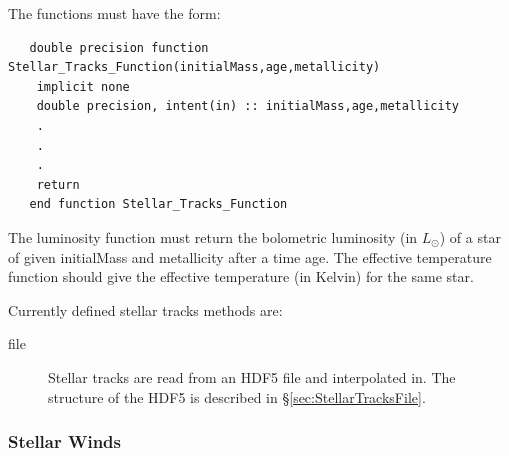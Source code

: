The functions must have the form:
\begin{verbatim}
   double precision function Stellar_Tracks_Function(initialMass,age,metallicity)
    implicit none
    double precision, intent(in) :: initialMass,age,metallicity
    .
    .
    .
    return
   end function Stellar_Tracks_Function 
\end{verbatim}
The luminosity function must return the bolometric luminosity (in $L_\odot$) of a star of given {\normalfont \ttfamily initialMass} and {\normalfont \ttfamily metallicity} after a time {\normalfont \ttfamily age}. The effective temperature function should give the effective temperature (in Kelvin) for the same star.

Currently defined stellar tracks methods are:
\begin{description}
 \item [{\normalfont \ttfamily file}] Stellar tracks are read from an HDF5 file and interpolated in. The structure of the HDF5 is described in \S\ref{sec:StellarTracksFile}.
\end{description}

\subsubsection{Stellar Winds}

